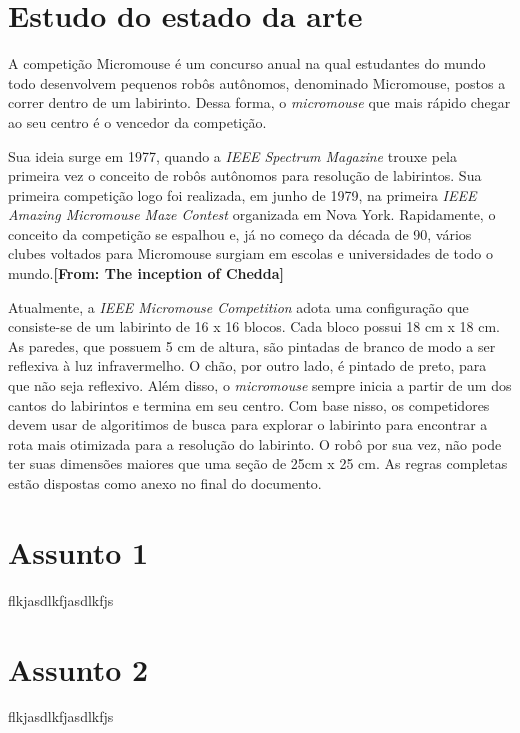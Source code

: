 \section{Estudo do estado da arte}
\label{sec:sota}
 \hspace{0.5cm} A competição Micromouse é um concurso anual na qual estudantes do mundo todo desenvolvem pequenos robôs autônomos, denominado Micromouse, postos a correr dentro de um labirinto. Dessa forma, o \textit{micromouse} que mais rápido chegar ao seu centro é o vencedor da competição.

 \hspace{0.5cm} Sua ideia surge em 1977, quando a \textit{IEEE Spectrum Magazine} trouxe pela primeira vez o conceito de robôs autônomos para resolução de labirintos. Sua primeira competição logo foi realizada, em junho de 1979, na primeira \textit{IEEE Amazing Micromouse Maze Contest} organizada em Nova York. Rapidamente, o conceito da competição se espalhou e, já no começo da década de 90, vários clubes voltados para Micromouse surgiam em escolas e universidades de todo o mundo.\textbf{[From: The inception of Chedda] }
 
 \hspace{0.5cm} Atualmente, a \textit{IEEE Micromouse Competition} adota uma configuração que consiste-se de um labirinto de 16 x 16 blocos. Cada bloco possui 18 cm x 18 cm. As paredes, que possuem 5 cm de altura, são pintadas de branco de modo a ser reflexiva à luz infravermelho. O chão, por outro lado, é pintado de preto, para que não seja reflexivo. Além disso, o \textit{micromouse} sempre inicia a partir de um dos cantos do labirintos e termina em seu centro. Com base nisso, os competidores devem usar de algoritimos de busca para explorar o labirinto para encontrar a rota mais otimizada para a resolução do labirinto. O robô por sua vez, não pode ter suas dimensões maiores que uma seção de 25cm x 25 cm. As regras completas estão dispostas como anexo no final do documento.


\section{Assunto 1}
\label{sec:ass1}
flkjasdlkfjasdlkfjs

\section{Assunto 2}
\label{sec:ass2}
flkjasdlkfjasdlkfjs

